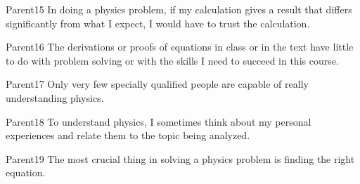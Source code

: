 \begin{question}{Parent15}
    \QuestionIndicative
    In doing a physics problem, if my calculation gives a result that differs
        significantly from what I expect, I would have to trust the calculation.
    \begin{choiceshoriz}[o]
    \end{choiceshoriz}
\end{question}

\begin{question}{Parent16}
    \QuestionIndicative
    The derivations or proofs of equations in class or in the text have little
        to do with problem solving or with the skills I need to succeed in
        this course.
    \begin{choiceshoriz}[o]
    \end{choiceshoriz}
\end{question}

\begin{question}{Parent17}
    \QuestionIndicative
    Only very few specially qualified people are capable of really
        understanding physics.
    \begin{choiceshoriz}[o]
    \end{choiceshoriz}
\end{question}

\begin{question}{Parent18}
    \QuestionIndicative
    To understand physics, I sometimes think about my personal experiences
        and relate them to the topic being analyzed.
    \begin{choiceshoriz}[o]
    \end{choiceshoriz}
\end{question}

\begin{question}{Parent19}
    \QuestionIndicative
    The most crucial thing in solving a physics problem is finding the
        right equation.
    \begin{choiceshoriz}[o]
    \end{choiceshoriz}
\end{question}

